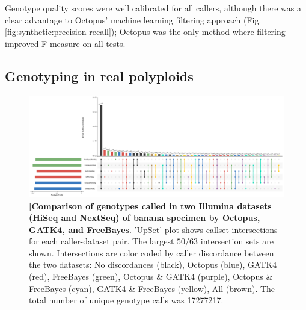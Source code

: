 \documentclass[notitlepage, twocolumn, 10pt]{article}
\begin{document}
Genotype quality scores were well calibrated for all callers, although there was a clear advantage to Octopus' machine learning filtering approach (Fig. \ref{fig:synthetic:precision-recall}); Octopus was the only method where filtering improved F-measure on all tests. 



\subsection*{Genotyping in real polyploids}

\begin{figure}[tp]
	\centering
    \includegraphics[width=\textwidth,height=0.4\textwidth]{figures/banana_intersection}
    \caption{\textbf{|\:Comparison of genotypes called in two Illumina datasets (HiSeq and NextSeq) of banana specimen by Octopus, GATK4, and FreeBayes}. 'UpSet' plot shows callset intersections for each caller-dataset pair. The largest $50/63$ intersection sets are shown. Intersections are color coded by caller discordance between the two datasets: No discordances (black), Octopus (blue), GATK4 (red), FreeBayes (green), Octopus \& GATK4 (purple), Octopus \& FreeBayes (cyan), GATK4 \& FreeBayes (yellow), All (brown). The total number of unique genotype calls was \num[group-separator={,}]{17277217}.}
    \label{fig:banana_intersection}
\end{figure}
\end{document}
